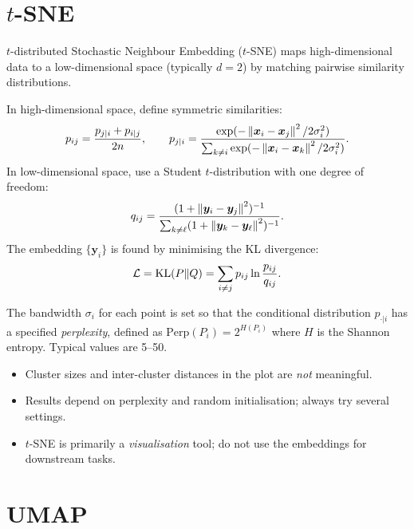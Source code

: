 \section{$t$-SNE}

\begin{definition}[$t$-SNE]
$t$-distributed Stochastic Neighbour Embedding ($t$-SNE) maps high-dimensional data to a low-dimensional space (typically $d=2$) by matching pairwise similarity distributions.

In high-dimensional space, define symmetric similarities:
\[
  p_{ij} = \frac{p_{j|i} + p_{i|j}}{2n}, \qquad
  p_{j|i} = \frac{\exp(-\left\| \bm{x}_i-\bm{x}_j \right\|^2 / 2\sigma_i^2)}{\sum_{k\neq i}\exp(-\left\| \bm{x}_i-\bm{x}_k \right\|^2 / 2\sigma_i^2)}.
\]
In low-dimensional space, use a Student $t$-distribution with one degree of freedom:
\[
  q_{ij} = \frac{(1+\left\| \bm{y}_i-\bm{y}_j \right\|^2)^{-1}}{\sum_{k\neq \ell}(1+\left\| \bm{y}_k-\bm{y}_\ell \right\|^2)^{-1}}.
\]
The embedding $\{\bm{y}_i\}$ is found by minimising the KL divergence:
\[
  \mathcal{L} = \mathrm{KL}(P\|Q) = \sum_{i\neq j} p_{ij}\ln\frac{p_{ij}}{q_{ij}}.
\]
\end{definition}

\begin{remark}
The bandwidth $\sigma_i$ for each point is set so that the conditional distribution $p_{\cdot|i}$ has a specified \emph{perplexity}, defined as $\text{Perp}(P_i)=2^{H(P_i)}$ where $H$ is the Shannon entropy. Typical values are 5--50.
\end{remark}

\begin{warning}[title=\textbf{$t$-SNE Caveats}]
\begin{itemize}
  \item Cluster sizes and inter-cluster distances in the plot are \emph{not} meaningful.
  \item Results depend on perplexity and random initialisation; always try several settings.
  \item $t$-SNE is primarily a \emph{visualisation} tool; do not use the embeddings for downstream tasks.
\end{itemize}
\end{warning}

\section{UMAP}

